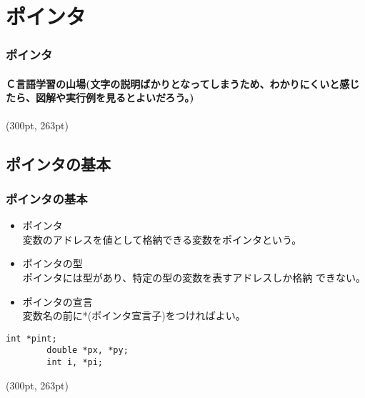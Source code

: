 \documentclass[dvipdfmx]{beamer}
\begin{document}
\section{ポインタ}
\begin{frame}[t]
    \frametitle{ポインタ}
    \framesubtitle{Ｃ言語学習の山場(文字の説明ばかりとなってしまうため、わかりにくいと感じたら、図解や実行例を見るとよいだろう。)}
    \tableofcontents[sections={2, 12}]
    \begin{textblock*}{0.3\linewidth}(300pt, 263pt)
        \space
    \end{textblock*}
\end{frame}

\subsection{ポインタの基本}
\begin{frame}[t, fragile]
    \frametitle{ポインタの基本}
    \begin{itemize}
        \item ポインタ\\
            変数のアドレスを値として格納できる変数をポインタという。
        \item ポインタの型\\
            ポインタには型があり、特定の型の変数を表すアドレスしか格納
            できない。
        \item ポインタの宣言\\
            変数名の前に*(ポインタ宣言子)をつければよい。
    \end{itemize}
    \begin{lstlisting}[gobble=8, caption=Example\space of\space Pointer\space Declaration]
        int *pint;
        double *px, *py;
        int i, *pi;
    \end{lstlisting}
    \begin{textblock*}{0.3\linewidth}(300pt, 263pt)
        \space
    \end{textblock*}
\end{frame}
\end{document}
